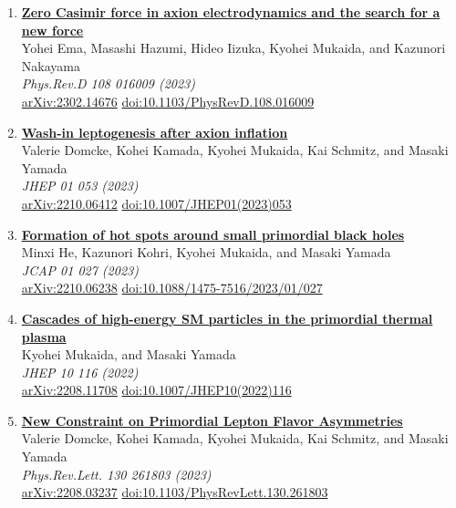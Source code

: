 \begin{enumerate}
\item \textbf{\href{https://arxiv.org/abs/2302.14676}{Zero Casimir force in axion electrodynamics and the search for a new force}}\\
Yohei Ema, Masashi Hazumi, Hideo Iizuka, Kyohei Mukaida, and Kazunori Nakayama\\
\emph{Phys.Rev.D 108 016009 (2023)}
\\ \href{https://arxiv.org/abs/2302.14676}{arXiv:2302.14676} \href{https://doi.org/10.1103/PhysRevD.108.016009}{doi:10.1103/PhysRevD.108.016009}

\item \textbf{\href{https://arxiv.org/abs/2210.06412}{Wash-in leptogenesis after axion inflation}}\\
Valerie Domcke, Kohei Kamada, Kyohei Mukaida, Kai Schmitz, and Masaki Yamada\\
\emph{JHEP 01 053 (2023)}
\\ \href{https://arxiv.org/abs/2210.06412}{arXiv:2210.06412} \href{https://doi.org/10.1007/JHEP01(2023)053}{doi:10.1007/JHEP01(2023)053}

\item \textbf{\href{https://arxiv.org/abs/2210.06238}{Formation of hot spots around small primordial black holes}}\\
Minxi He, Kazunori Kohri, Kyohei Mukaida, and Masaki Yamada\\
\emph{JCAP 01 027 (2023)}
\\ \href{https://arxiv.org/abs/2210.06238}{arXiv:2210.06238} \href{https://doi.org/10.1088/1475-7516/2023/01/027}{doi:10.1088/1475-7516/2023/01/027}

\item \textbf{\href{https://arxiv.org/abs/2208.11708}{Cascades of high-energy SM particles in the primordial thermal plasma}}\\
Kyohei Mukaida, and Masaki Yamada\\
\emph{JHEP 10 116 (2022)}
\\ \href{https://arxiv.org/abs/2208.11708}{arXiv:2208.11708} \href{https://doi.org/10.1007/JHEP10(2022)116}{doi:10.1007/JHEP10(2022)116}

\item \textbf{\href{https://arxiv.org/abs/2208.03237}{New Constraint on Primordial Lepton Flavor Asymmetries}}\\
Valerie Domcke, Kohei Kamada, Kyohei Mukaida, Kai Schmitz, and Masaki Yamada\\
\emph{Phys.Rev.Lett. 130 261803 (2023)}
\\ \href{https://arxiv.org/abs/2208.03237}{arXiv:2208.03237} \href{https://doi.org/10.1103/PhysRevLett.130.261803}{doi:10.1103/PhysRevLett.130.261803}


\end{enumerate}
